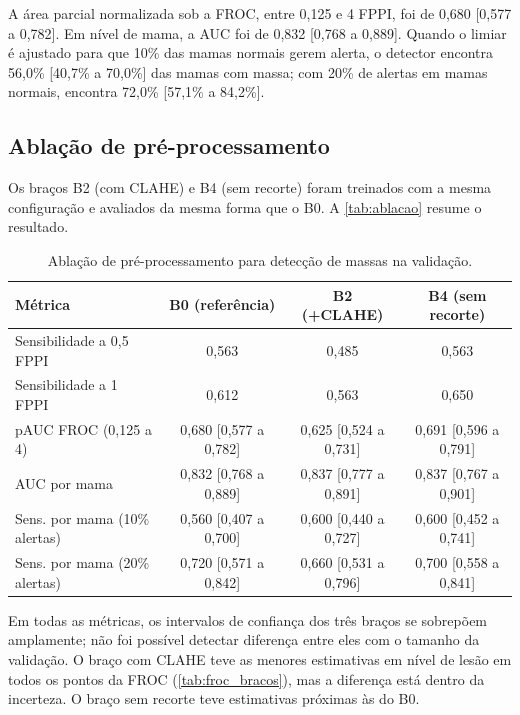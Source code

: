 A área parcial normalizada sob a FROC, entre 0,125 e 4 FPPI, foi de 0,680 [0,577 a 0,782]. Em nível de mama, a AUC foi de 0,832 [0,768 a 0,889]. Quando o limiar é ajustado para que 10\% das mamas normais gerem alerta, o detector encontra 56,0\% [40,7\% a 70,0\%] das mamas com massa; com 20\% de alertas em mamas normais, encontra 72,0\% [57,1\% a 84,2\%].


\subsection{Ablação de pré-processamento}

Os braços B2 (com CLAHE) e B4 (sem recorte) foram treinados com a mesma configuração e avaliados da mesma forma que o B0. A \autoref{tab:ablacao} resume o resultado.

\begin{table}[htb]
  \centering
  \caption{Ablação de pré-processamento para detecção de massas na validação.}
  \label{tab:ablacao}
  \footnotesize
  \begin{tabular}{@{}lccc@{}}
    \toprule
    Métrica & B0 (referência) & B2 (+CLAHE) & B4 (sem recorte) \\
    \midrule
    Sensibilidade a 0,5 FPPI & 0,563 & 0,485 & 0,563 \\
    Sensibilidade a 1 FPPI   & 0,612 & 0,563 & 0,650 \\
    pAUC FROC (0,125 a 4)    & 0,680 [0,577 a 0,782] & 0,625 [0,524 a 0,731] & 0,691 [0,596 a 0,791] \\
    AUC por mama             & 0,832 [0,768 a 0,889] & 0,837 [0,777 a 0,891] & 0,837 [0,767 a 0,901] \\
    Sens. por mama (10\% alertas) & 0,560 [0,407 a 0,700] & 0,600 [0,440 a 0,727] & 0,600 [0,452 a 0,741] \\
    Sens. por mama (20\% alertas) & 0,720 [0,571 a 0,842] & 0,660 [0,531 a 0,796] & 0,700 [0,558 a 0,841] \\
    \bottomrule
  \end{tabular}
\end{table}

Em todas as métricas, os intervalos de confiança dos três braços se sobrepõem amplamente; não foi possível detectar diferença entre eles com o tamanho da validação. O braço com CLAHE teve as menores estimativas em nível de lesão em todos os pontos da FROC (\autoref{tab:froc_bracos}), mas a diferença está dentro da incerteza. O braço sem recorte teve estimativas próximas às do B0.

